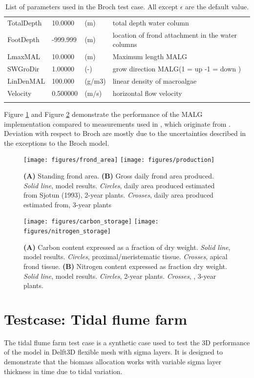 \documentclass{deltares_manual}
\begin{document}
\begin{longtable}{|l|l|l|l|}
	TotalDepth & 10.0000 & (m) & total depth water column\\ 
	FootDepth & -999.999 & (m) & location of frond attachment in the water columns\\ 
	LmaxMAL & 10.0000 & (m) & Maximum length MALG\\ 
	SWGroDir & 1.00000 & (-) & grow direction MALG(1 = up -1 = down )\\ 
	LinDenMAL & 100.000 & (g/m3) & linear density of macroalgae\\ 
	Velocity & 0.500000 & (m/s) & horizontal flow velocity\\ 
	\hline
	\caption{List of parameters used in the Broch test case. All except $\epsilon$ are the default value.}
	\label{tab:parameters}
\end{longtable}

Figure \ref{fig:biomass} and Figure \ref{fig:storage} demonstrate the performance of the MALG implementation compared to measurements used in \cite{broch2012}, which originate from \cite{sjotun1993}. Deviation with respect to Broch are mostly due to the uncertainties described in the exceptions to the Broch model.

\begin{figure}[H]
	\centering
	\texttt{[image: figures/frond\_area]}
	\texttt{[image: figures/production]}
	\caption{\textbf{(A)} Standing frond area. \textbf{(B)} Gross daily frond area produced. \textit{Solid line}, model results. \textit{Circles}, daily area produced estimated from Sjotun (1993), 2-year plants. \textit{Crosses}, daily area produced estimated from\cite{sjotun1993}, 3-year plants}
	\label{fig:biomass}
\end{figure}

\begin{figure}[H]
	\centering
	\texttt{[image: figures/carbon\_storage]}
	\texttt{[image: figures/nitrogen\_storage]}
	\caption{\textbf{(A)} Carbon content expressed as a fraction of dry weight. \textit{Solid line}, model results. \textit{Circles}, \cite{sjotun1993} proximal/meristematic tissue. \textit{Crosses}, apical frond tissue. \textbf{(B)} Nitrogen content expressed as fraction dry weight. \textit{Solid line}, model results. \textit{Circles}, \cite{sjotun1993} 2-year plants. \textit{Crosses}, \cite{sjotun1993}, 3-year plants.}
	\label{fig:storage}
\end{figure}

\section{Testcase: Tidal flume farm}
The tidal flume farm test case is a synthetic case used to test the 3D performance of the model in Delft3D flexible mesh with sigma layers. It is designed to demonstrate that the biomass allocation works with variable sigma layer thickness in time due to tidal variation.
\end{document}
